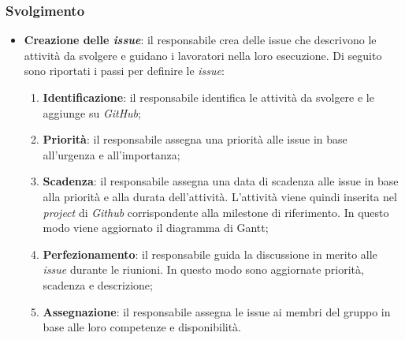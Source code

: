 \subsubsection{Svolgimento}
\begin{itemize}
	\item \textbf{Creazione delle \textit{issue}}: il responsabile crea
	      delle issue che descrivono le attività da svolgere e guidano i
	      lavoratori nella loro esecuzione. Di seguito sono riportati i passi
	      per definire le \textit{issue}:
	      \begin{enumerate}
		      \item \textbf{Identificazione}: il responsabile identifica le
		            attività da svolgere e le aggiunge su \textit{GitHub};

		      \item \textbf{Priorità}: il responsabile assegna una priorità
		            alle issue in base all'urgenza e all'importanza;

		      \item \textbf{Scadenza}: il responsabile assegna una data di
		            scadenza alle issue in base alla priorità e alla durata
		            dell'attività. L'attività viene quindi inserita nel
		            \textit{project} di \textit{Github} corrispondente alla
		            milestone di riferimento. In questo modo viene aggiornato il
		            diagramma di Gantt;

		      \item \textbf{Perfezionamento}: il responsabile guida la
		            discussione in merito alle \textit{issue} durante le
		            riunioni. In questo modo sono aggiornate priorità,
		            scadenza e descrizione;

		      \item \textbf{Assegnazione}: il responsabile assegna le issue
		            ai membri del gruppo in base alle loro competenze e
		            disponibilità.
	      \end{enumerate}
\end{itemize}
